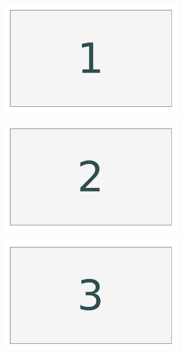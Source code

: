 \begin{figure}[H] %
\captionsetup[subfigure]{justification=centering}
\centering
\begin{framed}
\begin{subfigure}{.32\textwidth}
    \centering
    \includegraphics[width=\linewidth]{figures/layout_1.pdf}
\end{subfigure}
%
\begin{subfigure}{.32\textwidth}
    \centering
    \includegraphics[width=\linewidth]{figures/layout_2.pdf}
\end{subfigure}
%
\begin{subfigure}{.32\textwidth}
    \centering
    \includegraphics[width=\linewidth]{figures/layout_3.pdf}

\end{subfigure}
\end{framed}
\end{figure}
